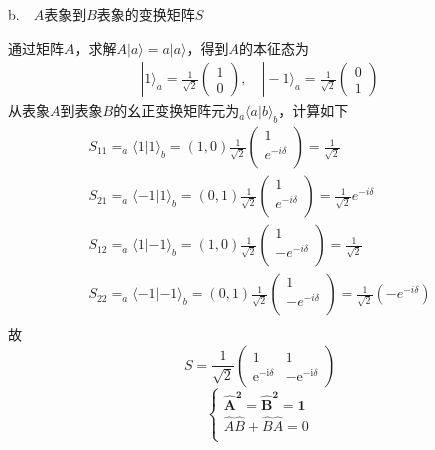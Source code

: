 b.\ \  $A$表象到$B$表象的变换矩阵$S$

通过矩阵$A$，求解$A|a \rangle=a|a \rangle$，得到$A$的本征态为
$$
\begin{array}{l}
|1\rangle_{a}=\frac{1}{\sqrt{2}}\left(\begin{array}{l}
1 \\
0
\end{array}\right), \quad|-1\rangle_{a}=\frac{1}{\sqrt{2}}\left(\begin{array}{l}
0 \\
1
\end{array}\right)
\end{array}
$$
从表象$A$到表象$B$的幺正变换矩阵元为$_a\langle a|b\rangle _b$，计算如下
$$
\begin{array}{l}
	\left. S_{11}=_a\langle 1|1\rangle _b=(1,0)\frac{1}{\sqrt{2}}\left( \begin{array}{c}
	1\\
	e^{-i\delta}\\
\end{array} \right) =\frac{1}{\sqrt{2}} \right.\\
	S_{21}=_a\langle -1|1\rangle _b=(0,1)\frac{1}{\sqrt{2}}\left( \begin{array}{c}
	1\\
	e^{-i\delta}\\
\end{array} \right) =\frac{1}{\sqrt{2}}e^{-i\delta}\\
	S_{12}=_a\langle 1|-1\rangle _b=(1,0)\frac{1}{\sqrt{2}}\left( \begin{array}{c}
	1\\
	-e^{-i\delta}\\
\end{array} \right) =\frac{1}{\sqrt{2}}\\
	S_{22}=_a\langle -1|-1\rangle _b=(0,1)\frac{1}{\sqrt{2}}\left( \begin{array}{c}
	1\\
	-e^{-i\delta}\\
\end{array} \right) =\frac{1}{\sqrt{2}}\left( -e^{-i\delta} \right)\\
\end{array}
$$
故
$$
S=\frac{1}{\sqrt{2}}\left(\begin{array}{cc}
1 & 1 \\
\mathrm{e}^{-\mathrm{i} \delta} & -\mathrm{e}^{-\mathrm{i} \delta}
\end{array}\right)
$$
$$
\left\{ \begin{array}{l}
	\bm{\hat{A}^2=\hat{B}^2=1}\\
	\hat{A}\hat{B}+\hat{B}\hat{A}=0\\
\end{array} \right. 
$$